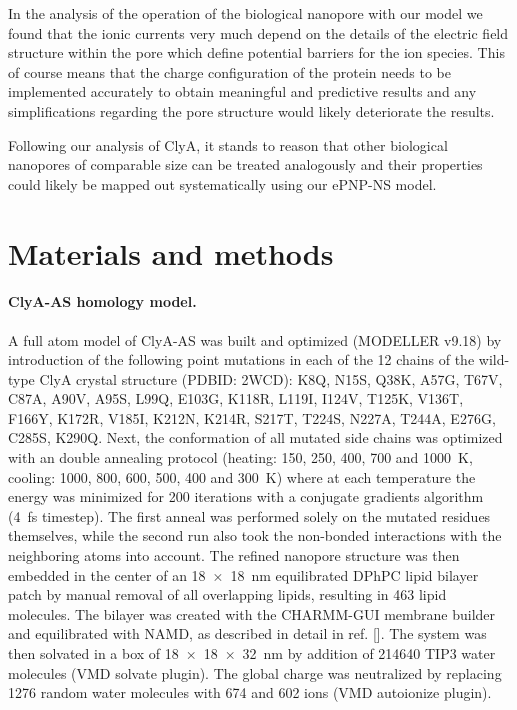 \documentclass[journal=ancac3,manuscript=article,etalmode=truncate,maxauthors=0,layout=onecolumn]{achemso}
\begin{document}
In the analysis of the operation of the biological nanopore with our model we
found that the ionic currents very much depend on the details of the electric
field structure within the pore which define potential barriers for the ion
species. This of course means that the charge configuration of the protein needs
to be implemented accurately to obtain meaningful and predictive results and any
simplifications regarding the pore structure would likely deteriorate the
results.

Following our analysis of ClyA, it stands to reason that other biological
nanopores of comparable size can be treated analogously and their properties
could likely be mapped out systematically using our ePNP-NS model.


\section{Materials and methods}\label{sec:methods}

\paragraph{ClyA-AS homology model.}
%
A full atom model of ClyA-AS\cite{Soskine-2013} was built and optimized
(MODELLER v9.18\cite{Sali-1993}) by introduction of the following point
mutations in each of the 12 chains of the wild-type ClyA crystal structure
(PDBID: 2WCD\cite{Mueller-2009}): K8Q, N15S, Q38K, A57G, T67V, C87A, A90V, A95S,
L99Q, E103G, K118R, L119I, I124V, T125K, V136T, F166Y, K172R, V185I, K212N,
K214R, S217T, T224S, N227A, T244A, E276G, C285S, K290Q. Next, the conformation
of all mutated side chains was optimized with an double annealing protocol
(heating: 150, 250, 400, 700 and \SI{1000}{\kelvin}, cooling: 1000, 800, 600,
500, 400 and \SI{300}{\kelvin}) where at each temperature the energy was
minimized for 200 iterations with a conjugate gradients algorithm (\SI{4}{\fs}
timestep).\cite{Shanno-1980} The first anneal was performed solely on the
mutated residues themselves, while the second run also took the non-bonded
interactions with the neighboring atoms into account. The refined nanopore
structure was then embedded in the center of an \SI{18x18}{\nm} equilibrated
DPhPC lipid bilayer patch by manual removal of all overlapping lipids, resulting
in 463 lipid molecules. The bilayer was created with the
CHARMM-GUI\cite{Jo-2008} membrane builder\cite{Lee-2016} and equilibrated with
NAMD\cite{Phillips-2005}, as described in detail in ref. [].
The system was then solvated in a box of \SI{18x18x32}{\nm} by addition of
214640 TIP3 water molecules (VMD solvate plugin). The global charge was
neutralized by replacing 1276 random water molecules with 674 \Na{} and 602
\Cl{} ions (VMD autoionize plugin).\cite{Humphrey-1996}
\end{document}
